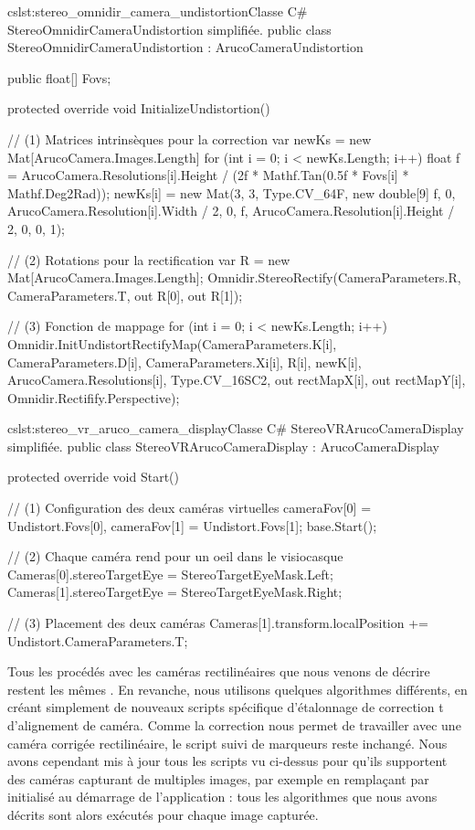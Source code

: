 \begin{listingETS}{cs}{lst:stereo_omnidir_camera_undistortion}{Classe C\# StereoOmnidirCameraUndistortion simplifiée.}
  public class StereoOmnidirCameraUndistortion : ArucoCameraUndistortion
  {
    public float[] Fovs;

    protected override void InitializeUndistortion()
    {
      // (1) Matrices intrinsèques pour la correction
      var newKs = new Mat[ArucoCamera.Images.Length]
      for (int i = 0; i < newKs.Length; i++)
      {
        float f = ArucoCamera.Resolutions[i].Height / (2f * Mathf.Tan(0.5f * Fovs[i] * Mathf.Deg2Rad));
        newKs[i] = new Mat(3, 3, Type.CV_64F, new double[9] {
          f, 0, ArucoCamera.Resolution[i].Width / 2,
          0, f, ArucoCamera.Resolution[i].Height / 2,
          0, 0, 1});
      }

      // (2) Rotations pour la rectification
      var R = new Mat[ArucoCamera.Images.Length];
      Omnidir.StereoRectify(CameraParameters.R, CameraParameters.T, out R[0], out R[1]);

      // (3) Fonction de mappage
      for (int i = 0; i < newKs.Length; i++)
      {
        Omnidir.InitUndistortRectifyMap(CameraParameters.K[i], CameraParameters.D[i], CameraParameters.Xi[i], R[i], newK[i], ArucoCamera.Resolutions[i], Type.CV_16SC2, out rectMapX[i], out rectMapY[i], Omnidir.Rectifify.Perspective);
      }
    }
  }
\end{listingETS}

\begin{listingETS}{cs}{lst:stereo_vr_aruco_camera_display}{Classe C\# StereoVRArucoCameraDisplay simplifiée.}
  public class StereoVRArucoCameraDisplay : ArucoCameraDisplay
  {
    protected override void Start()
    {
      // (1) Configuration des deux caméras virtuelles
      cameraFov[0] = Undistort.Fovs[0], cameraFov[1] = Undistort.Fovs[1];
      base.Start();

      // (2) Chaque caméra rend pour un oeil dans le visiocasque
      Cameras[0].stereoTargetEye = StereoTargetEyeMask.Left;
      Cameras[1].stereoTargetEye = StereoTargetEyeMask.Right;

      // (3) Placement des deux caméras
      Cameras[1].transform.localPosition += Undistort.CameraParameters.T;
    }
  }
\end{listingETS}

Tous les procédés avec les caméras rectilinéaires que nous venons de décrire restent les mêmes . En revanche, nous utilisons quelques algorithmes différents, en créant simplement de nouveaux scripts spécifique d'étalonnage de correction t d'alignement de caméra. Comme la correction nous permet de travailler avec une caméra corrigée rectilinéaire, le script suivi de marqueurs reste inchangé. Nous avons cependant mis à jour tous les scripts vu ci-dessus pour qu'ils supportent des caméras capturant de multiples images, par exemple en remplaçant  par  initialisé au démarrage de l'application : tous les algorithmes que nous avons décrits sont alors exécutés pour chaque image capturée.

